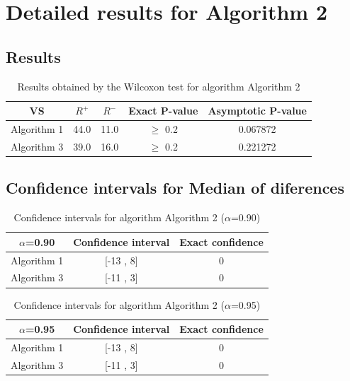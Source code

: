 \documentclass[a4paper,10pt]{article}
\begin{document}
 \clearpage 


\section{Detailed results for Algorithm 2}


\subsection{Results}

\begin{table}[!htp]
\centering\small
\begin{tabular}{
|c|c|c|c|c|}
\hline
 VS & $R^{+}$ & $R^{-}$ & Exact P-value & Asymptotic P-value \\ \hline 
Algorithm 1 & 44.0 & 11.0 & $\geq$ 0.2 & 0.067872\\ \hline 
Algorithm 3 & 39.0 & 16.0 & $\geq$ 0.2 & 0.221272\\ \hline 

\end{tabular}
\caption{Results obtained by the Wilcoxon test for algorithm Algorithm 2}
\end{table}

\subsection{Confidence intervals for Median of diferences}

\begin{table}[!htp]
\centering\small
\begin{tabular}{
|c|c|c|}
\hline
 $\alpha$=0.90 & Confidence interval & Exact confidence \\ \hline 
Algorithm 1 & [-13 , 8] & 0\\ \hline 
Algorithm 3 & [-11 , 3] & 0\\ \hline 

\end{tabular}
\caption{Confidence intervals for algorithm Algorithm 2 ($\alpha$=0.90)}
\end{table}
\begin{table}[!htp]
\centering\small
\begin{tabular}{
|c|c|c|}
\hline
 $\alpha$=0.95 & Confidence interval & Exact confidence \\ \hline 
Algorithm 1 & [-13 , 8] & 0\\ \hline 
Algorithm 3 & [-11 , 3] & 0\\ \hline 

\end{tabular}
\caption{Confidence intervals for algorithm Algorithm 2 ($\alpha$=0.95)}
\end{table}
\end{document}
